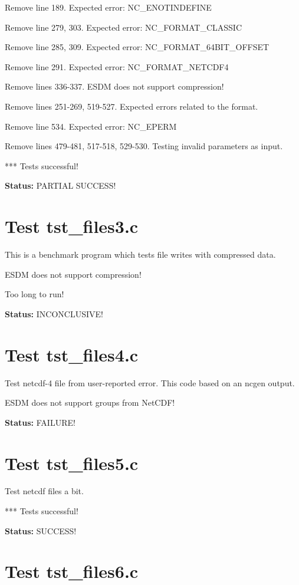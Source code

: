 Remove line 189. Expected error: NC\_ENOTINDEFINE

Remove line 279, 303. Expected error: NC\_FORMAT\_CLASSIC

Remove line 285, 309. Expected error: NC\_FORMAT\_64BIT\_OFFSET

Remove line 291. Expected error: NC\_FORMAT\_NETCDF4

Remove lines 336-337. ESDM does not support compression!

Remove lines 251-269, 519-527. Expected errors related to the format.

Remove line 534. Expected error: NC\_EPERM

Remove lines 479-481, 517-518, 529-530. Testing invalid parameters as input.

*** Tests successful!

{\bf \large Status: } PARTIAL SUCCESS!

\section{Test tst\_files3.c}

This is a benchmark program which tests file writes with compressed data.

ESDM does not support compression!

Too long to run!

{\bf \large Status: } INCONCLUSIVE!

\section{Test tst\_files4.c}

Test netcdf-4 file from user-reported error. This code based on an ncgen output.

ESDM does not support groups from NetCDF!

{\bf \large Status: } FAILURE!

\section{Test tst\_files5.c}

Test netcdf files a bit.

*** Tests successful!

{\bf \large Status: } SUCCESS!

\section{Test tst\_files6.c}

